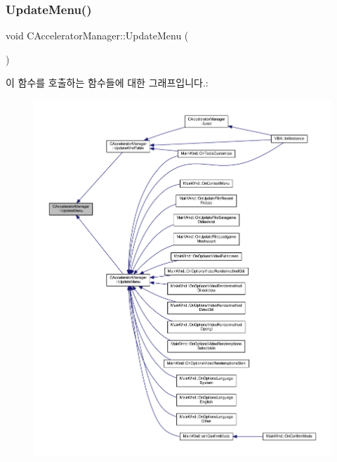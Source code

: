 \subsubsection{\texorpdfstring{Update\+Menu()}{UpdateMenu()}\hspace{0.1cm}{\footnotesize\ttfamily [2/2]}}
{\footnotesize\ttfamily void C\+Accelerator\+Manager\+::\+Update\+Menu (\begin{DoxyParamCaption}{ }\end{DoxyParamCaption})}

이 함수를 호출하는 함수들에 대한 그래프입니다.\+:
\nopagebreak
\begin{figure}[H]
\begin{center}
\leavevmode
\includegraphics[width=350pt]{class_c_accelerator_manager_ac854ec5263a7bab961bf63aec3938984_icgraph}
\end{center}
\end{figure}
\mbox{\label{class_c_accelerator_manager_a3fa9c8e4f44acc76cc40fc7382e597d8}} 
